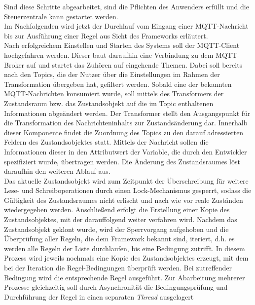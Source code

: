         Sind diese Schritte abgearbeitet, sind die Pflichten des Anwenders erfüllt und die Steuerzentrale kann gestartet werden. 
        \\
        Im Nachfolgenden wird jetzt der Durchlauf vom Eingang einer \acs{MQTT}-Nachricht bis zur Ausführung einer Regel aus Sicht des Frameworks 
        erläutert.
        \\
        \linebreak
        Nach erfolgreichem Einstellen und Starten des Systems soll der \acs{MQTT}-Client hochgefahren werden. Dieser baut daraufhin eine 
        Verbindung zu dem \acs{MQTT}-Broker auf und startet das Zuhören auf eingehende Themen. Dabei soll bereits nach den Topics,  
        die der Nutzer über die Einstellungen im Rahmen der Transformation übergeben hat, gefiltert werden. Sobald eine der bekannten 
        \acs{MQTT}-Nachrichten konsumiert wurde, soll mittels des Transformers der Zustandsraum bzw. das Zustandsobjekt 
        auf die im Topic enthaltenen Informationen abgeändert werden. Der Transformer stellt den Ausgangspunkt für die Transformation 
        des Nachrichteninhalts zur Zustandsänderung dar. Innerhalb dieser Komponente findet die Zuordnung 
        des Topics zu den darauf adressierten Feldern des Zustandsobjektes statt. Mittels der Nachricht sollen die Informationen dieser 
        in den Attributwert der Variable, die durch den Entwickler spezifiziert wurde, übertragen werden. Die Änderung des 
        Zustandsraumes löst daraufhin den weiteren Ablauf aus. 
        \\
        Das aktuelle Zustandsobjekt wird zum Zeitpunkt der Überschreibung für weitere Lese- und Schreiboperationen durch einen Lock-Mechanismus gesperrt, sodass 
        die Gültigkeit des Zustandsraumes nicht erlischt und nach wie vor reale Zuständen wiedergegeben werden. Anschließend erfolgt die 
        Erstellung einer Kopie des Zustandsobjektes, mit der 
        darauffolgend weiter verfahren wird. Nachdem das Zustandsobjekt geklont wurde, wird der Sperrvorgang aufgehoben und die 
        Überprüfung aller Regeln, die dem Framework bekannt sind, iteriert, d.h. es werden alle Regeln der Liste durchlaufen, bis eine Bedingung zutrifft. In diesem Prozess 
        wird jeweils nochmals eine Kopie des Zustandsobjektes erzeugt, mit dem bei der Iteration die Regel-Bedingungen überprüft werden. 
        Bei zutreffender Bedingung wird die entsprechende Regel ausgeführt. Zur Abarbeitung mehrerer Prozesse 
        gleichzeitig soll durch Asynchronität die Bedingungsprüfung und Durchführung der Regel in einen separaten \textit{Thread} ausgelagert 
